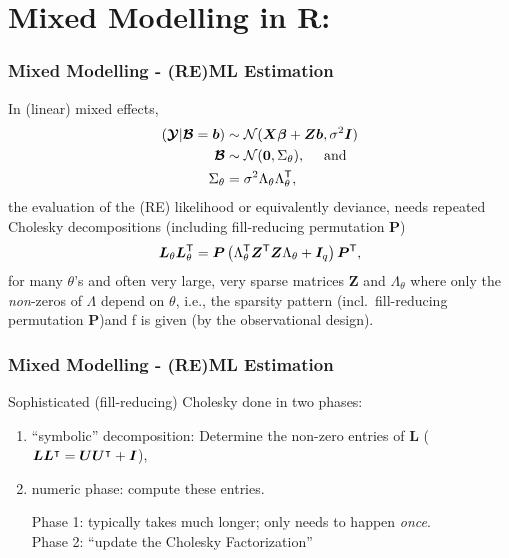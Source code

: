 \section{Mixed Modelling in R: }\label{sec:lmer}
\begin{frame}\frametitle{Mixed Modelling - (RE)ML Estimation}%
In (linear) mixed effects,
\begin{equation}%
  \label{eq:LMMdist}
  \begin{aligned}
    (\bc Y|\bc B=\bm b)&\sim\mathcal{N}(\bm X\bm\beta+\bm Z\bm
    b,\sigma^2\bm I)\\
    \bc{B}&\sim\mathcal{N}(\bm0,\Sigma_\theta), \ \ \ \
    \textrm{and}\\
    \Sigma_\theta &= \sigma^2 \Lambda_\theta \Lambda_\theta\trans,
  \end{aligned}
\end{equation}
the evaluation of the (RE)
likelihood or equivalently deviance, needs repeated Cholesky decompositions
(including fill-reducing permutation $\bm P$)
\begin{equation}
  \label{eq:sparseCholeskyP}
  \bm L_\theta\bm L_\theta^{\mathsf{T}}
   = \bm P\left(\Lambda_\theta^{\mathsf{T}}\bm Z^{\mathsf{T}}\bm Z\Lambda_\theta
   +\bm I_q\right)\bm P^{\mathsf{T}},
\end{equation}
for many $\theta$'s %
and often very large, very sparse matrices $\bm Z$ and
$\Lambda_\theta$ where only the \emph{non}-zeros of $\Lambda$ depend on
$\theta$,  i.e., the sparsity pattern (incl.\ fill-reducing permutation
$\bm P$)and f is  given (by the observational design).
\end{frame}

\begin{frame}\frametitle{Mixed Modelling - (RE)ML Estimation}%
Sophisticated (fill-reducing) Cholesky done in two phases:
\begin{enumerate}
\item ``symbolic'' decomposition: Determine the non-zero entries of $\bm L$
  ($\bm L {\bm L}{}^{\intercal} = \bm{U} \bm{U}{}^{\intercal} + \bm{I}$),
\item numeric phase: compute these entries.

\bigskip

Phase 1: typically takes much longer; only needs to happen \emph{once}.\\
Phase 2: ``update the Cholesky Factorization''
\end{enumerate}
\end{frame}

